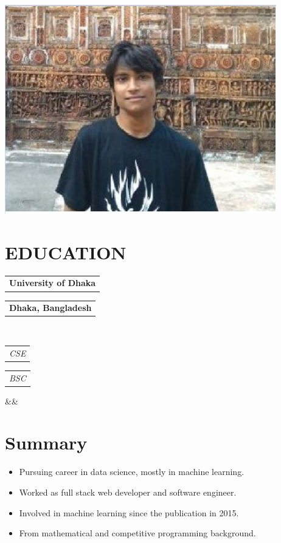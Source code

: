 \documentclass[11pt,a4paper,roman]{moderncv}
\makeatletter
\newcommand*{\customcventry}[7][.25em]{
  \begin{tabular}{@{}l} 
    {\bfseries #4}
  \end{tabular}
  \hfill%
  \begin{tabular}{l@{}}
     {\bfseries #5}
  \end{tabular} \\
  \begin{tabular}{@{}l} 
    {\itshape #3}
  \end{tabular}
  \hfill%
  \begin{tabular}{l@{}}
     {\itshape #2}
  \end{tabular}
  \ifx&#7&%
  \else{\\%
    \begin{minipage}{\maincolumnwidth}%
      \small#7%
    \end{minipage}}\fi%
  \par\addvspace{#1}}
\makeatother
\begin{document}

\makecvtitle
\vspace{-.2in}
\begin{center}
	\includegraphics[scale=.2]{pp1}
\end{center}
\vspace*{-.2in}

\section{EDUCATION}
{\customcventry{BSC}{CSE}{University of Dhaka}{Dhaka, Bangladesh}{}{}}

\section{Summary}
{
\begin{itemize}
	\item Pursuing career in data science, mostly in machine learning.
	\item Worked as full stack web developer and software engineer.
	\item Involved in machine learning since the publication in 2015.
	\item From mathematical and competitive programming background.
\end{itemize}
}
\end{document}
